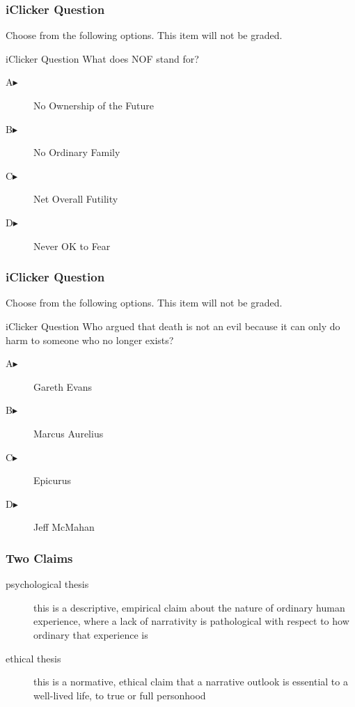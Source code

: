 \documentclass[xcolor=dvipsnames]{beamer}
\begin{document}
\begin{frame}
  \frametitle{iClicker Question}
Choose from the following options. This item will not be graded.
\begin{block}{iClicker Question}
What does NOF stand for?
\end{block}
\begin{description}
\item[A\hspace{.2in}$\blacktriangleright$] No Ownership of the Future
\item[B\hspace{.2in}$\blacktriangleright$] No Ordinary Family
\item[C\hspace{.2in}$\blacktriangleright$] Net Overall Futility
\item[D\hspace{.2in}$\blacktriangleright$] Never OK to Fear
\end{description}
\end{frame}

\begin{frame}
  \frametitle{iClicker Question}
Choose from the following options. This item will not be graded.
\begin{block}{iClicker Question}
Who argued that death is not an evil because it can only do harm to
someone who no longer exists?
\end{block}
\begin{description}
\item[A\hspace{.2in}$\blacktriangleright$] Gareth Evans
\item[B\hspace{.2in}$\blacktriangleright$] Marcus Aurelius
\item[C\hspace{.2in}$\blacktriangleright$] Epicurus
\item[D\hspace{.2in}$\blacktriangleright$] Jeff McMahan
\end{description}
\end{frame}

\begin{frame}
  \frametitle{Two Claims}
  \begin{description}
  \item[psychological thesis] this is a descriptive, empirical claim
    about the nature of ordinary human experience, where a lack of
    narrativity is pathological with respect to how ordinary that
    experience is
  \item[ethical thesis] this is a normative, ethical claim that a
    narrative outlook is essential to a well-lived life, to true or
    full personhood
  \end{description}
\end{frame}
\end{document}
